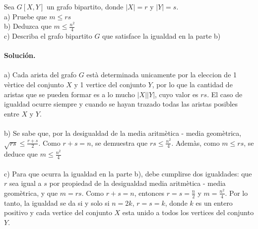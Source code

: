 \documentclass[12pt]{article}
\newenvironment{ejercicio}[2][Ejercicio]{\begin{trivlist}
\item[\hskip \labelsep {\bfseries #1}\hskip \labelsep {\bfseries #2.}]}{\end{trivlist}}
\begin{document}
\begin{ejercicio}{1.1.2}
\end{ejercicio}
Sea $G[X,Y]$ un grafo bipartito, donde $|X| = r$ y $|Y| = s$. 
\\
a) Pruebe que $ m  \leq  rs$
\\
b) Deduzca que $ m  \leq  \frac{n^2}{4}$
\\
c) Describa el grafo bipartito $G$ que satisface la igualdad en la parte b)
\\\\
\textbf{Solución.} 
\\\\
a) Cada arista del grafo $G$ està determinada unicamente por la eleccion de 1 vèrtice del conjunto $X$ y 1 vertice del conjunto $Y$, por lo que la cantidad de aristas que se pueden formar es a lo mucho $|X||Y|$, cuyo valor es $rs$. El caso de igualdad ocurre siempre y cuando se hayan trazado todas las aristas posibles entre $X$ y $Y$.
\\\\
b) Se sabe que, por la desigualdad de la media aritmètica - media geomètrica, $ \sqrt{rs}  \leq  \frac{r+s}{2}$. Como $r+s = n$, se demuestra que $ rs  \leq  \frac{n^2}{4}$. 
Ademàs, como  $ m  \leq  rs$, se deduce que $ m  \leq  \frac{n^2}{4}$
\\\\
c)  Para que ocurra la igualdad en la parte b), debe cumplirse dos igualdades: que $r$ sea igual a $s$ por propiedad de la desigualdad media aritmètica - media geomètrica, y que $m = rs$. Como $r + s = n$, entonces $r = s = \frac{n}{2}$ y $ m = \frac{n^2}{4}$. Por lo tanto, la igualdad se da si y solo si $n = 2k$, $r = s = k$, donde $k$ es un entero positivo y cada vertice del conjunto $X$ esta unido a todos los vertices del conjunto $Y$.
\end{document}
